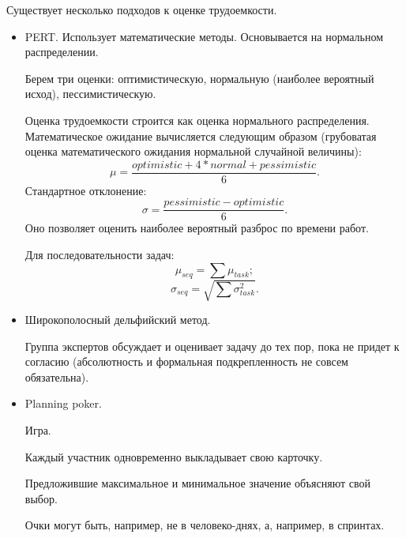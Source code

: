     \begin{Rem}
        Существует несколько подходов к оценке трудоемкости.
        \begin{itemize}
            \item PERT. Использует математические методы. Основывается на нормальном распределении.

            Берем три оценки: оптимистическую, нормальную (наиболее вероятный исход), пессимистическую.

            Оценка трудоемкости строится как оценка нормального распределения. Математическое ожидание вычисляется следующим образом (грубоватая оценка математического ожидания нормальной случайной величины): $$\mu = \frac{optimistic + 4 * normal + pessimistic}{6}.$$
            Стандартное отклонение: $$\sigma = \frac{pessimistic - optimistic}{6}.$$ Оно позволяет оценить наиболее вероятный разброс по времени работ.

            Для последовательности задач:
            $$\mu_{seq} = \sum \mu_{task};$$
            $$\sigma_{seq} = \sqrt{\sum \sigma_{task}^2}.$$

            \item Широкополосный дельфийский метод. 

            Группа экспертов обсуждает и оценивает задачу до тех пор, пока не придет к согласию (абсолютность и формальная подкрепленность не совсем обязательна).

            \item Planning poker.

            Игра.

            Каждый участник одновременно выкладывает свою карточку.

            Предложившие максимальное и минимальное значение объясняют свой выбор.

            Очки могут быть, например, не в человеко-днях, а, например, в спринтах.
        \end{itemize}
    \end{Rem}
